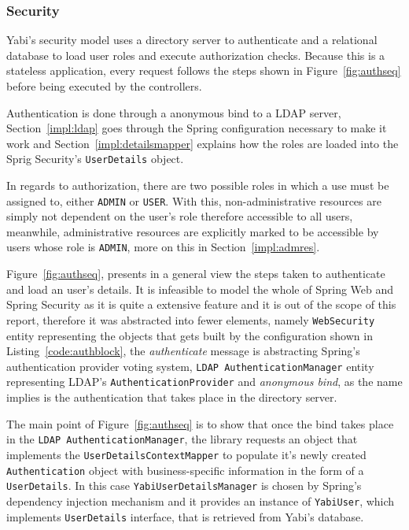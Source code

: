 \subsubsection{Security}
\gls{Yabi}'s security model uses a directory server to authenticate and a relational database to load user roles and execute authorization checks. Because this is a stateless application, every request follows the steps shown in Figure~\ref{fig:authseq} before being executed by the controllers.

Authentication is done through a anonymous bind to a \gls{LDAP} server, Section~\ref{impl:ldap} goes through the Spring configuration necessary to make it work and Section~\ref{impl:detailsmapper} explains how the roles are loaded into the Sprig Security's \texttt{UserDetails} object.

In regards to authorization, there are two possible roles in which a use must be assigned to, either \texttt{ADMIN} or \texttt{USER}. With this, non-administrative resources are simply not dependent on the user's role therefore accessible to all users, meanwhile, administrative resources are explicitly marked to be accessible by users whose role is \texttt{ADMIN}, more on this in Section~\ref{impl:admres}.

Figure~\ref{fig:authseq}, presents in a general view the steps taken to authenticate and load an user's details. It is infeasible to model the whole of Spring Web and Spring Security as it is quite a extensive feature and it is out of the scope of this report, therefore it was abstracted into fewer elements, namely \texttt{WebSecurity} entity representing the objects that gets built by the configuration shown in Listing~\ref{code:authblock}, the \textit{authenticate} message is abstracting Spring's authentication provider voting system, \texttt{LDAP AuthenticationManager} entity representing \gls{LDAP}'s \texttt{AuthenticationProvider} and \textit{anonymous bind}, as the name implies is the authentication that takes place in the directory server.

The main point of Figure~\ref{fig:authseq} is to show that once the bind takes place in the \texttt{LDAP AuthenticationManager}, the library requests an object that implements the \texttt{UserDetailsContextMapper} to populate it's newly created \texttt{Authentication} object with business-specific information in the form of a \texttt{UserDetails}. In this case \texttt{YabiUserDetailsManager} is chosen by Spring's dependency injection mechanism and it provides an instance of \texttt{YabiUser}, which implements \texttt{UserDetails} interface, that is retrieved from \gls{Yabi}'s database.

